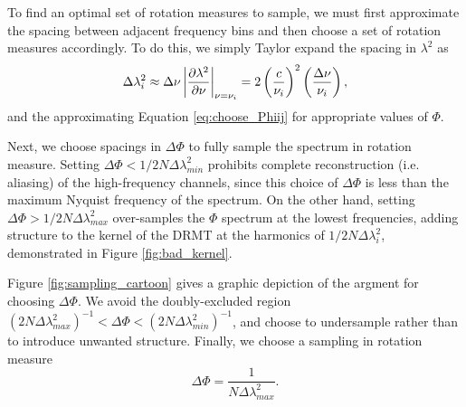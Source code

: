 To find an optimal set of rotation measures to sample, we must first approximate the spacing between
adjacent frequency bins and then choose a set of rotation measures accordingly. To do this, we
simply Taylor expand the spacing in $\lambda^2$ as 
\begin{equation}
  \Delta\lambda_i^2 \approx \Delta\nu\left|\frac{\partial \lambda^2}{\partial \nu}\right|_{\nu=\nu_i}
  = 2\left(\frac{c}{\nu_i}\right)^2\left(\frac{\Delta\nu}{\nu_i}\right),
  \label{eq:def_dlam2}
\end{equation}
and the approximating Equation \ref{eq:choose_Phiij} for appropriate values of $\Phi$.


Next, we choose spacings in $\Delta\Phi$ to fully sample the spectrum in rotation measure. Setting
$\Delta\Phi < 1/2N\Delta\lambda^2_{min}$ prohibits complete reconstruction (i.e. aliasing) of the 
high-frequency channels, since this choice of $\Delta\Phi$ is less than the maximum Nyquist frequency
of the spectrum. On the other hand, setting $\Delta\Phi > 1/2N\Delta\lambda_{max}^2$ over-samples the
$\Phi$ spectrum at the lowest frequencies, adding structure to the kernel of the DRMT at the
harmonics of $1/2N\Delta\lambda_i^2$, demonstrated in Figure \ref{fig:bad_kernel}.


Figure \ref{fig:sampling_cartoon} gives a graphic depiction of the argment for choosing
$\Delta\Phi$. We avoid the doubly-excluded region $(2N\Delta\lambda^2_{max})^{-1} < \Delta\Phi <
(2N\Delta\lambda^2_{min})^{-1}$, and choose to undersample rather than to introduce unwanted
structure. Finally, we choose a sampling in rotation measure
\begin{equation}
  \Delta\Phi = \frac{1}{N\Delta\lambda^2_{max}}.
  \label{eq:def_dphi}
\end{equation}

